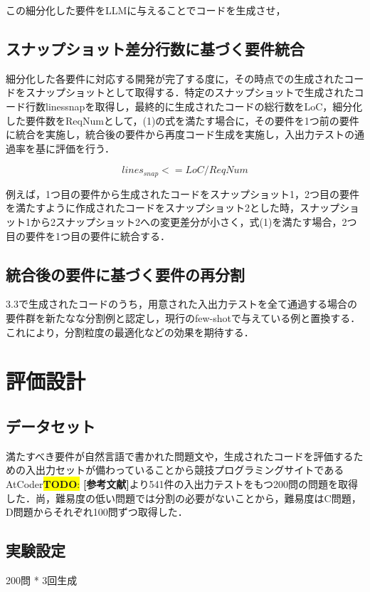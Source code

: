 \documentclass[submit,techrep,noauthor]{ipsj}
\newcommand{\todo}[1]{\colorbox{yellow}{{\bf TODO}:}{\color{red} {\textbf{[#1]}}}}
\begin{document}
この細分化した要件をLLMに与えることでコードを生成させ，

\subsection{スナップショット差分行数に基づく要件統合}
細分化した各要件に対応する開発が完了する度に，その時点での生成されたコードをスナップショットとして取得する．特定のスナップショットで生成されたコード行数linessnapを取得し，最終的に生成されたコードの総行数をLoC，細分化した要件数をReqNumとして，(1)の式を満たす場合に，その要件を1つ前の要件に統合を実施し，統合後の要件から再度コード生成を実施し，入出力テストの通過率を基に評価を行う．

\begin{equation}
    lines_{snap} <= LoC / ReqNum
\end{equation}

例えば，1つ目の要件から生成されたコードをスナップショット1，2つ目の要件を満たすように作成されたコードをスナップショット2とした時，スナップショット1から2スナップショット2への変更差分が小さく，式(1)を満たす場合，2つ目の要件を1つ目の要件に統合する．

\subsection{統合後の要件に基づく要件の再分割}
3.3で生成されたコードのうち，用意された入出力テストを全て通過する場合の要件群を新たなな分割例と認定し，現行のfew-shotで与えている例と置換する．これにより，分割粒度の最適化などの効果を期待する．

\section{評価設計}
\subsection{データセット}
満たすべき要件が自然言語で書かれた問題文や，生成されたコードを評価するための入出力セットが備わっていることから競技プログラミングサイトであるAtCoder\todo{参考文献}より541件の入出力テストをもつ200問の問題を取得した．尚，難易度の低い問題では分割の必要がないことから，難易度はC問題，D問題からそれぞれ100問ずつ取得した．

\subsection{実験設定}
200問 * 3回生成
\end{document}
